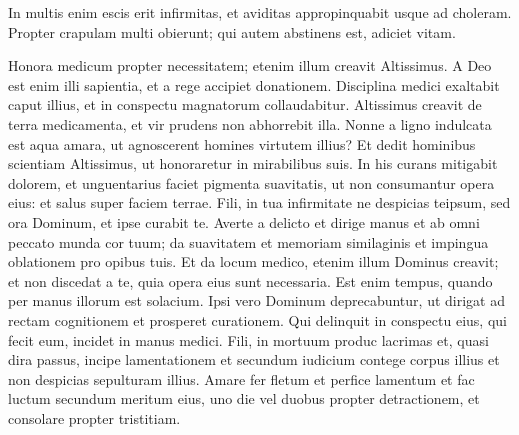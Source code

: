 \begin{biblechapter}
\begin{biblechapter}
\begin{biblechapter}
\begin{biblechapter}
\begin{biblechapter}
\begin{biblechapter}
\begin{biblechapter}
\begin{biblechapter}
\begin{biblechapter}
\begin{biblechapter}
\begin{biblechapter}
\begin{biblechapter}
\begin{biblechapter}
\begin{biblechapter}
\begin{biblechapter}
\begin{biblechapter}
\begin{biblechapter}
\begin{biblechapter}
\begin{biblechapter}
\begin{biblechapter}
\begin{biblechapter}
\begin{biblechapter}
\begin{biblechapter}
\begin{biblechapter}
\begin{biblechapter}
\begin{biblechapter}
\begin{biblechapter}
\begin{biblechapter}
\begin{biblechapter}
\begin{biblechapter}
\begin{biblechapter}
\begin{biblechapter}
\begin{biblechapter}
\begin{biblechapter}
\begin{biblechapter}
\begin{biblechapter}
\begin{biblechapter}
 \verse In multis enim escis erit infirmitas,
 et aviditas appropinquabit usque ad choleram.
 \verse Propter crapulam multi obierunt;
 qui autem abstinens est, adiciet vitam.
 
\begin{biblechapter}
\verse Honora medicum propter necessitatem;
 etenim illum creavit Altissimus.
 \verse A Deo est enim illi sapientia,
 et a rege accipiet donationem.
 \verse Disciplina medici exaltabit caput illius,
 et in conspectu magnatorum collaudabitur.
 \verse Altissimus creavit de terra medicamenta,
 et vir prudens non abhorrebit illa.
 \verse Nonne a ligno indulcata est aqua amara,
 \verse ut agnoscerent homines virtutem illius?
 Et dedit hominibus scientiam Altissimus,
 ut honoraretur in mirabilibus suis.
 \verse In his curans mitigabit dolorem,
 et unguentarius faciet pigmenta suavitatis,
 ut non consumantur opera eius:
 \verse et salus super faciem terrae.
 \verse Fili, in tua infirmitate ne despicias teipsum,
 sed ora Dominum, et ipse curabit te.
 \verse Averte a delicto et dirige manus
 et ab omni peccato munda cor tuum;
 \verse da suavitatem et memoriam similaginis
 et impingua oblationem pro opibus tuis.
 Et da locum medico, 
\verse etenim illum Dominus creavit;
 et non discedat a te, quia opera eius sunt necessaria.
 \verse Est enim tempus, quando per manus illorum est solacium.
 \verse Ipsi vero Dominum deprecabuntur,
 ut dirigat ad rectam cognitionem
 et prosperet curationem.
 \verse Qui delinquit in conspectu eius, qui fecit eum,
 incidet in manus medici.
 \verse Fili, in mortuum produc lacrimas
 et, quasi dira passus, incipe lamentationem
 et secundum iudicium contege corpus illius
 et non despicias sepulturam illius.
 \verse Amare fer fletum et perfice lamentum
 \verse et fac luctum secundum meritum eius,
 uno die vel duobus propter detractionem,
 et consolare propter tristitiam.

\end{biblechapter}
\end{biblechapter}
\end{biblechapter}
\end{biblechapter}
\end{biblechapter}
\end{biblechapter}
\end{biblechapter}
\end{biblechapter}
\end{biblechapter}
\end{biblechapter}
\end{biblechapter}
\end{biblechapter}
\end{biblechapter}
\end{biblechapter}
\end{biblechapter}
\end{biblechapter}
\end{biblechapter}
\end{biblechapter}
\end{biblechapter}
\end{biblechapter}
\end{biblechapter}
\end{biblechapter}
\end{biblechapter}
\end{biblechapter}
\end{biblechapter}
\end{biblechapter}
\end{biblechapter}
\end{biblechapter}
\end{biblechapter}
\end{biblechapter}
\end{biblechapter}
\end{biblechapter}
\end{biblechapter}
\end{biblechapter}
\end{biblechapter}
\end{biblechapter}
\end{biblechapter}
\end{biblechapter}
